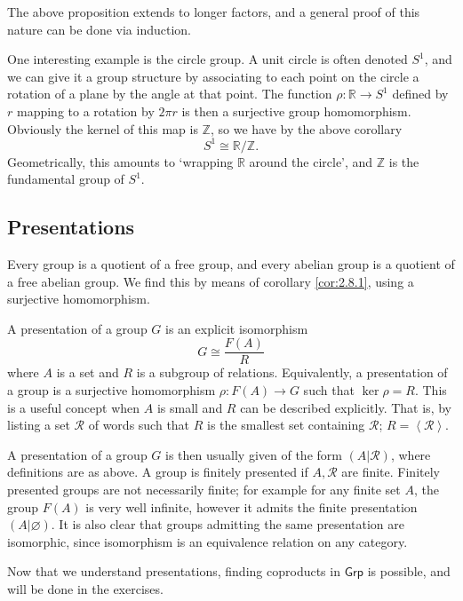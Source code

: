 The above proposition extends to longer factors, and a general proof of this nature can be done via induction.

One interesting example is the circle group. A unit circle is often denoted $S^1$, and we can give it a group structure by associating to each point on the circle a rotation of a plane by the angle at that point. The function $\rho : \mathbb{R} \to S^1$ defined by $r$ mapping to a rotation by $2\pi r$ is then a surjective group homomorphism. Obviously the kernel of this map is $\mathbb{Z}$, so we have by the above corollary
\[
	S^1 \cong \mathbb{R}/\mathbb{Z}
.\]
Geometrically, this amounts to `wrapping $\mathbb{R}$ around the circle', and $\mathbb{Z}$ is the fundamental group of $S^1$.

\subsection{Presentations}

Every group is a quotient of a free group, and every abelian group is a quotient of a free abelian group. We find this by means of corollary \ref{cor:2.8.1}, using a surjective homomorphism.

A presentation of a group $G$ is an explicit isomorphism
\[
	G \cong \frac{F(A)}{R}
\]
where $A$ is a set and $R$ is a subgroup of relations. Equivalently, a presentation of a group is a surjective homomorphism $\rho : F(A) \to G$ such that $\ker \rho =R$. This is a useful concept when $A$ is small and $R$ can be described explicitly. That is, by listing a set $\mathscr{R} $ of words such that $R$ is the smallest set containing $\mathscr{R} $; $R=\left\langle \mathscr{R}  \right\rangle $.

A presentation of a group $G$ is then usually given of the form $(A|\mathscr{R} )$, where definitions are as above. A group is finitely presented if $A,\mathscr{R} $ are finite. Finitely presented groups are not necessarily finite; for example for any finite set $A$, the group $F(A)$ is very well infinite, however it admits the finite presentation $(A|\varnothing)$. It is also clear that groups admitting the same presentation are isomorphic, since isomorphism is an equivalence relation on any category.

Now that we understand presentations, finding coproducts in $\mathsf{Grp}$ is possible, and will be done in the exercises.

